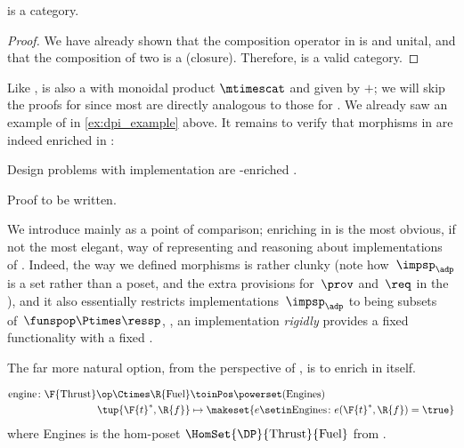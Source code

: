 \begin{lemma}
    \label{lem:DPI-is-category}
    \DPI is a category.
\end{lemma}

\begin{proof}
    We have already shown that the composition operator in \DPI is  and unital, and that the composition of two  is a  (closure).
    Therefore, \DPI is a valid category.
\end{proof}

Like \DP, \DPI is also a  with monoidal product $\mtimescat$ and  given by $+$;
we will skip the proofs for \DPI since most are directly analogous to those for \DP.
We already saw an example of \DPI in \cref{ex:dpi_example} above.
It remains to verify that morphisms in \DPI are indeed enriched in \Set:

\begin{proposition}\label{prop:dps-are-enriched}
    Design problems with implementation are \Set-enriched .
\end{proposition}
\begin{publictodo}
    Proof to be written.
\end{publictodo}
We introduce \DPI mainly as a point of comparison; enriching in \Set is the most obvious, if not the most elegant, way of representing and reasoning about implementations of .
Indeed, the way we defined morphisms is rather clunky (note how~$\impsp_\adp$ is a set rather than a poset, and the extra provisions for~$\prov$ and~$\req$ in the ), and it also essentially restricts implementations~$\impsp_\adp$ to being subsets of~$\funspop \Ptimes \ressp$, \ie, an implementation \emph{rigidly} provides a fixed functionality \fun with a fixed \res.

The far more natural option, from the perspective of , is to enrich  in \DP itself.

\begin{example}
    \begin{equation}
        \begin{aligned}
            \text{engine} \colon \F{\text{Thrust}}\op \Ctimes \R{\text{Fuel}} & \toinPos \powerset(\text{Engines}) \\
            \tup{\F{t}^*,\R{f}}                                               & \mapsto \makeset{ e \setin \text{Engines} \colon e(\F{t}^*, \R{f}) = \true }
        \end{aligned}
    \end{equation}
    where Engines is the hom-poset $\HomSet{\DP}{\text{Thrust}}{\text{Fuel}}$ from \XXX. %
\end{example}

